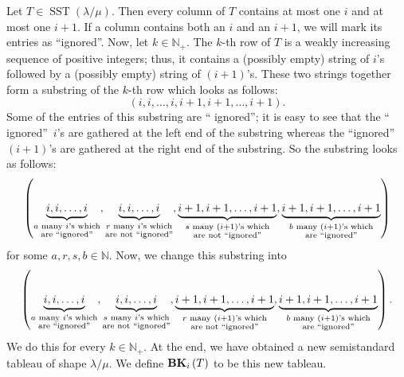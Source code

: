 \documentclass[numbers=enddot,12pt,final,onecolumn,notitlepage]{scrartcl}%
\theoremstyle{definition}
\begin{document}
Let $T\in\operatorname*{SST}\left(  \lambda/\mu\right)  $. Then every column of $T$ contains at most one $i$ and
at most one $i+1$. If a column contains both an
$i$ and an $i+1$, we will mark its entries as
\textquotedblleft ignored\textquotedblright. Now, let $k\in\mathbb{N}_{+}$.
The $k$-th row of $T$ is a weakly increasing sequence of positive integers;
thus, it contains a (possibly empty) string of $i$'s followed by a (possibly
empty) string of $\left(  i+1\right)  $'s. These two strings together form a
substring of the $k$-th row which looks as follows:%
\[
\left(  i,i,\ldots,i,i+1,i+1,\ldots,i+1\right).
\]
Some of the entries of this substring are \textquotedblleft
ignored\textquotedblright; it is easy to see that the \textquotedblleft
ignored\textquotedblright\ $i$'s are gathered at the left end of the substring
whereas the \textquotedblleft ignored\textquotedblright\ $\left(  i+1\right)
$'s are gathered at the right end of the substring. So the substring looks
as follows:
\[
\left(  \underbrace{i,i,\ldots,i}_{\substack{a\text{ many }i\text{'s
which}\\\text{are \textquotedblleft ignored\textquotedblright}}%
},\underbrace{i,i,\ldots,i}_{\substack{r\text{ many }i\text{'s which}%
\\\text{are not \textquotedblleft ignored\textquotedblright}}%
},\underbrace{i+1,i+1,\ldots,i+1}_{\substack{s\text{ many }\left(  i+1\right)
\text{'s which}\\\text{are not \textquotedblleft ignored\textquotedblright}%
}},\underbrace{i+1,i+1,\ldots,i+1}_{\substack{b\text{ many }\left(
i+1\right)  \text{'s which}\\\text{are \textquotedblleft
ignored\textquotedblright}}}\right)
\]
for some $a,r,s,b\in\mathbb{N}$. Now, we change this substring into%
\[
\left(  \underbrace{i,i,\ldots,i}_{\substack{a\text{ many }i\text{'s
which}\\\text{are \textquotedblleft ignored\textquotedblright}}%
},\underbrace{i,i,\ldots,i}_{\substack{s\text{ many }i\text{'s which}%
\\\text{are not \textquotedblleft ignored\textquotedblright}}%
},\underbrace{i+1,i+1,\ldots,i+1}_{\substack{r\text{ many }\left(  i+1\right)
\text{'s which}\\\text{are not \textquotedblleft ignored\textquotedblright}%
}},\underbrace{i+1,i+1,\ldots,i+1}_{\substack{b\text{ many }\left(
i+1\right)  \text{'s which}\\\text{are \textquotedblleft
ignored\textquotedblright}}}\right)  .
\]
We do this for every $k\in\mathbb{N}_{+}$. At the end, we have obtained a new semistandard
tableau of shape $\lambda/\mu$. We define ${\mathbf{BK}}_{i}\left(
T\right)  $ to be this new tableau.
\end{document}
